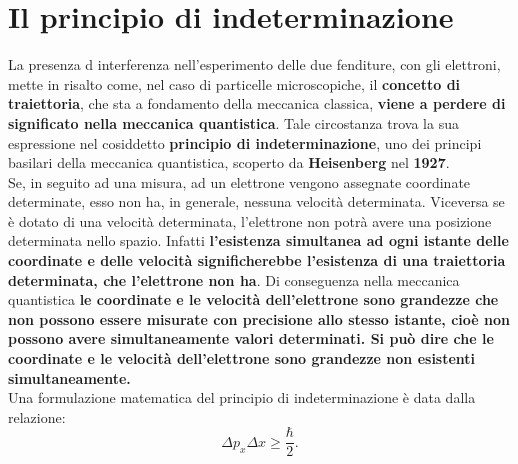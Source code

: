 \section{Il principio di indeterminazione}
La presenza d interferenza nell'esperimento delle due fenditure, con gli elettroni, mette in risalto come, nel caso di particelle microscopiche, il \textbf{concetto di traiettoria}, che sta a fondamento della meccanica classica, \textbf{viene a perdere di significato nella meccanica quantistica}. Tale circostanza trova la sua espressione nel cosiddetto \textbf{principio di indeterminazione}, uno dei principi basilari della meccanica quantistica, scoperto da \textbf{Heisenberg} nel \textbf{1927}.\\
Se, in seguito ad una misura, ad un elettrone vengono assegnate coordinate determinate, esso non ha, in generale, nessuna velocità determinata. Viceversa se è dotato di una velocità determinata, l'elettrone non potrà avere una posizione determinata nello spazio. Infatti \textbf{l'esistenza simultanea ad ogni istante delle coordinate e delle velocità significherebbe l'esistenza di una traiettoria determinata, che l'elettrone non ha}. Di conseguenza nella meccanica quantistica \textbf{le coordinate e le velocità dell'elettrone sono grandezze che non possono essere misurate con precisione allo stesso istante, cioè non possono avere simultaneamente valori determinati. Si può dire che le coordinate e le velocità dell'elettrone sono grandezze non esistenti simultaneamente.}\\
Una formulazione matematica del principio di indeterminazione è data dalla relazione:
\begin{equation}
\Delta p_x \Delta x \geq \frac{\hbar}{2}.
\end{equation}
